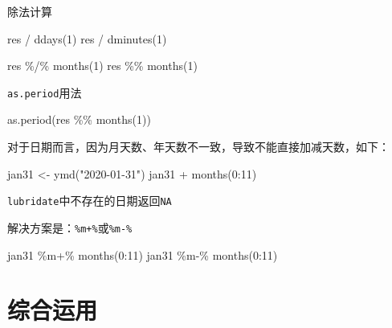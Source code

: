 \documentclass[
]{book}
\newenvironment{Shaded}{\begin{snugshade}}{\end{snugshade}}
\newcommand{\DecValTok}[1]{\textcolor[rgb]{0.00,0.00,0.81}{#1}}
\newcommand{\FunctionTok}[1]{\textcolor[rgb]{0.00,0.00,0.00}{#1}}
\newcommand{\NormalTok}[1]{#1}
\newcommand{\OtherTok}[1]{\textcolor[rgb]{0.56,0.35,0.01}{#1}}
\newcommand{\SpecialCharTok}[1]{\textcolor[rgb]{0.00,0.00,0.00}{#1}}
\newcommand{\StringTok}[1]{\textcolor[rgb]{0.31,0.60,0.02}{#1}}
\begin{document}
除法计算

\begin{Shaded}
\begin{Highlighting}[]
\NormalTok{res }\SpecialCharTok{/} \FunctionTok{ddays}\NormalTok{(}\DecValTok{1}\NormalTok{)}
\NormalTok{res }\SpecialCharTok{/} \FunctionTok{dminutes}\NormalTok{(}\DecValTok{1}\NormalTok{)}


\NormalTok{res }\SpecialCharTok{\%/\%} \FunctionTok{months}\NormalTok{(}\DecValTok{1}\NormalTok{)}
\NormalTok{res }\SpecialCharTok{\%\%} \FunctionTok{months}\NormalTok{(}\DecValTok{1}\NormalTok{)}
\end{Highlighting}
\end{Shaded}

\texttt{as.period}用法

\begin{Shaded}
\begin{Highlighting}[]
\FunctionTok{as.period}\NormalTok{(res }\SpecialCharTok{\%\%} \FunctionTok{months}\NormalTok{(}\DecValTok{1}\NormalTok{))}
\end{Highlighting}
\end{Shaded}

对于日期而言，因为月天数、年天数不一致，导致不能直接加减天数，如下：

\begin{Shaded}
\begin{Highlighting}[]
\NormalTok{jan31 }\OtherTok{\textless{}{-}} \FunctionTok{ymd}\NormalTok{(}\StringTok{"2020{-}01{-}31"}\NormalTok{)}
\NormalTok{jan31 }\SpecialCharTok{+} \FunctionTok{months}\NormalTok{(}\DecValTok{0}\SpecialCharTok{:}\DecValTok{11}\NormalTok{)}
\end{Highlighting}
\end{Shaded}

\texttt{lubridate}中不存在的日期返回\texttt{NA}

解决方案是：\texttt{\%m+\%}或\texttt{\%m-\%}

\begin{Shaded}
\begin{Highlighting}[]
\NormalTok{jan31 }\SpecialCharTok{\%m+\%} \FunctionTok{months}\NormalTok{(}\DecValTok{0}\SpecialCharTok{:}\DecValTok{11}\NormalTok{)}
\NormalTok{jan31 }\SpecialCharTok{\%m{-}\%} \FunctionTok{months}\NormalTok{(}\DecValTok{0}\SpecialCharTok{:}\DecValTok{11}\NormalTok{)}
\end{Highlighting}
\end{Shaded}

\hypertarget{ux7efcux5408ux8fd0ux7528-1}{%
\section{综合运用}\label{ux7efcux5408ux8fd0ux7528-1}}
\end{document}
